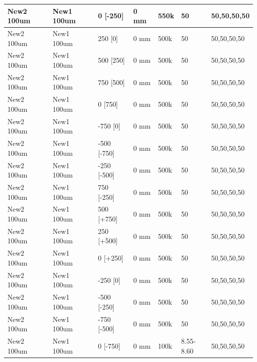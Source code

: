 \begin{refsection}
\begin{table}
\begin{tabular}{|l|l|l|l|l|l|l|}
            New2 100um  & New1 100um  & 0 {[}-250{]}     & 0 mm     & 550k   & 50            & 50,50,50,50       \\ \hline
            New2 100um  & New1 100um  & 250 {[}0{]}      & 0 mm     & 500k   & 50            & 50,50,50,50       \\ \hline
            New2 100um  & New1 100um  & 500 {[}250{]}    & 0 mm     & 500k   & 50            & 50,50,50,50       \\ \hline
            New2 100um  & New1 100um  & 750 {[}500{]}    & 0 mm     & 500k   & 50            & 50,50,50,50       \\ \hline
            New2 100um  & New1 100um  & 0 {[}750{]}      & 0 mm     & 500k   & 50            & 50,50,50,50       \\ \hline
            New2 100um  & New1 100um  & -750 {[}0{]}     & 0 mm     & 500k   & 50            & 50,50,50,50       \\ \hline
            New2 100um  & New1 100um  & -500 {[}-750{]}  & 0 mm     & 500k   & 50            & 50,50,50,50       \\ \hline
            New2 100um  & New1 100um  & -250 {[}-500{]}  & 0 mm     & 500k   & 50            & 50,50,50,50       \\ \hline
            New2 100um  & New1 100um  & 750 {[}-250{]}   & 0 mm     & 500k   & 50            & 50,50,50,50       \\ \hline
            New2 100um  & New1 100um  & 500 {[}+750{]}   & 0 mm     & 500k   & 50            & 50,50,50,50       \\ \hline
            New2 100um  & New1 100um  & 250 {[}+500{]}   & 0 mm     & 500k   & 50            & 50,50,50,50       \\ \hline
            New2 100um  & New1 100um  & 0 {[}+250{]}     & 0 mm     & 500k   & 50            & 50,50,50,50       \\ \hline
            New2 100um  & New1 100um  & -250 {[}0{]}     & 0 mm     & 500k   & 50            & 50,50,50,50       \\ \hline
            New2 100um  & New1 100um  & -500 {[}-250{]}  & 0 mm     & 500k   & 50            & 50,50,50,50       \\ \hline
            New2 100um  & New1 100um  & -750 {[}-500{]}  & 0 mm     & 500k   & 50            & 50,50,50,50       \\ \hline
            New2 100um  & New1 100um  & 0 {[}-750{]}     & 0 mm     & 100k   & 8.55-8.60     & 50,50,50,50       \\ \hline

\end{tabular}
\end{table}
\end{refsection}
